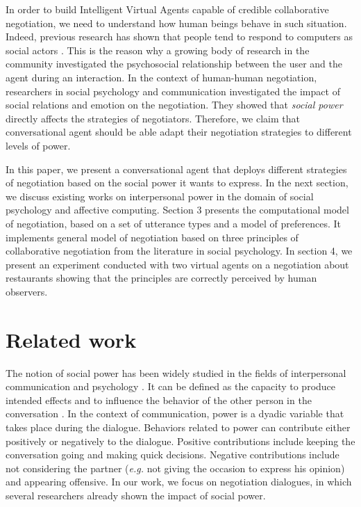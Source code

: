 \documentclass{llncs}
\begin{document}
		In order to build Intelligent Virtual Agents capable of credible collaborative negotiation, we need to understand how human beings behave in such situation. Indeed, previous research has shown that people tend to respond to computers as social actors \cite{bickmore2005establishing}. This is the reason why a growing body of research in the community investigated the psychosocial relationship between the user and the agent during an interaction. In the context of human-human negotiation, researchers in social psychology and communication \cite{dunbar2005perceptions,de1995impact} investigated the impact of social relations and emotion on the negotiation. They showed that  \emph{social power} directly affects the strategies of negotiators. Therefore, we claim that conversational agent should be able adapt their negotiation strategies to different levels of power.
		
		In this paper, we present a conversational agent that deploys different strategies of negotiation based on the social power it wants to express. In the next section, we discuss existing works on interpersonal power in the domain of social psychology and affective computing. Section 3 presents the computational model of negotiation, based on a set of utterance types and a model of preferences. It implements general model of negotiation based on three principles of collaborative negotiation from the literature in social psychology. In section 4, we present an experiment conducted with two virtual agents on a negotiation about restaurants showing that the principles are correctly perceived by human observers.	
		
		\section{Related work}
		The notion of social power has been widely studied in the fields of interpersonal communication and psychology \cite{kecskes2013research}. It can be defined as the capacity to produce intended effects and to influence the behavior of the other person in the conversation \cite{dunbar2005perceptions}. In the context of communication, power is a dyadic variable that takes place during the dialogue.
		Behaviors related to power can contribute either positively or negatively to the dialogue. Positive contributions include keeping the conversation going and making quick decisions. Negative contributions include not considering the partner (\emph{e.g.} not giving the occasion to express his opinion) and appearing offensive. In our work, we focus on negotiation dialogues, in which several researchers already shown the impact of social power\cite{de2004influence,burgoonnonverbal}.
		\vspace{-1em} 
\end{document}

